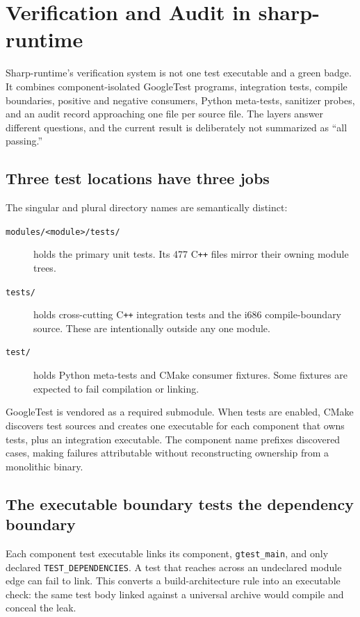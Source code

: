 \chapter{Verification and Audit in sharp-runtime}
\label{ch:sharp-verification-audit}

Sharp-runtime's verification system is not one test executable and a green badge. It combines
component-isolated GoogleTest programs, integration tests, compile boundaries, positive and
negative consumers, Python meta-tests, sanitizer probes, and an audit record approaching one
file per source file. The layers answer different questions, and the current result is
deliberately not summarized as ``all passing.''

\section{Three test locations have three jobs}

The singular and plural directory names are semantically distinct:

\begin{description}
  \item[\texttt{modules/<module>/tests/}] holds the primary unit tests. Its 477 C\texttt{++}
  files mirror their owning module trees.
  \item[\texttt{tests/}] holds cross-cutting C\texttt{++} integration tests and the i686
  compile-boundary source. These are intentionally outside any one module.
  \item[\texttt{test/}] holds Python meta-tests and CMake consumer fixtures. Some fixtures are
  expected to fail compilation or linking.
\end{description}

GoogleTest is vendored as a required submodule. When tests are enabled, CMake discovers test
sources and creates one executable for each component that owns tests, plus an integration
executable. The component name prefixes discovered cases, making failures attributable without
reconstructing ownership from a monolithic binary.

\section{The executable boundary tests the dependency boundary}

Each component test executable links its component, \texttt{gtest\_main}, and only declared
\texttt{TEST\_DEPENDENCIES}. A test that reaches across an undeclared module edge can fail to
link. This converts a build-architecture rule into an executable check: the same test body
linked against a universal archive would compile and conceal the leak.

